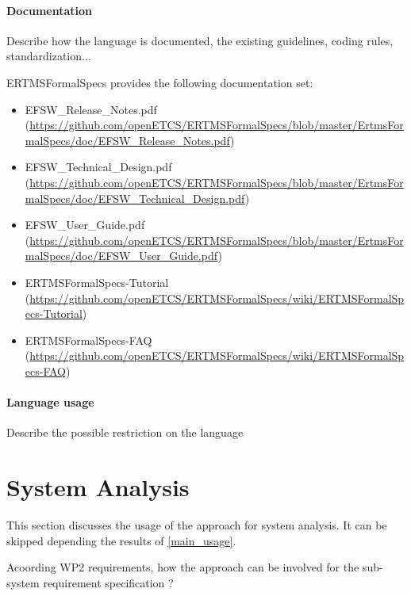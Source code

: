 \paragraph{Documentation} Describe how the language is documented, the existing guidelines, coding rules, standardization...

ERTMSFormalSpecs provides the following documentation set:

\begin{itemize}
	\item EFSW\_Release\_Notes.pdf (\url{https://github.com/openETCS/ERTMSFormalSpecs/blob/master/ErtmsFormalSpecs/doc/EFSW\_Release\_Notes.pdf})
	\item EFSW\_Technical\_Design.pdf (\url{https://github.com/openETCS/ERTMSFormalSpecs/blob/master/ErtmsFormalSpecs/doc/EFSW\_Technical\_Design.pdf})
	\item EFSW\_User\_Guide.pdf (\url{https://github.com/openETCS/ERTMSFormalSpecs/blob/master/ErtmsFormalSpecs/doc/EFSW\_User\_Guide.pdf})
	\item ERTMSFormalSpecs-Tutorial (\url{https://github.com/openETCS/ERTMSFormalSpecs/wiki/ERTMSFormalSpecs-Tutorial})
	\item ERTMSFormalSpecs-FAQ (\url{https://github.com/openETCS/ERTMSFormalSpecs/wiki/ERTMSFormalSpecs-FAQ})
\end{itemize}


\paragraph{Language usage} Describe the possible restriction on the language



\section{System Analysis}
This section discusses the usage of the approach for system analysis.
It can be skipped depending the results of \ref{main_usage}.

Acoording WP2 requirements, how the approach can be involved for the sub-system requirement specification ?

